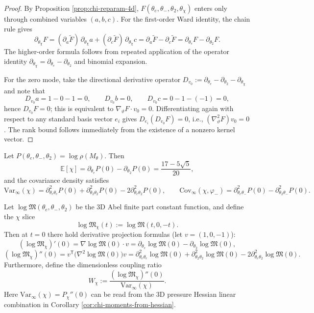 \begin{proof}
By Proposition \ref{prop:chi-reparam-4d}, \(F(\theta_e,\theta_-,\theta_2,\theta_\chi)\) enters only through combined variables \((a,b,c)\).
For the first-order Ward identity, the chain rule gives
$$
\partial_{\theta_\chi}F
=(\partial_a\widetilde F)\,\partial_{\theta_\chi}a+(\partial_c\widetilde F)\,\partial_{\theta_\chi}c
=\partial_a\widetilde F-\partial_c\widetilde F
=\partial_{\theta_e}F-\partial_{\theta_2}F.
$$
The higher-order formula follows from repeated application of the operator identity \(\partial_{\theta_\chi}=\partial_{\theta_e}-\partial_{\theta_2}\) and binomial expansion.
\par
For the zero mode, take the directional derivative operator
\(
D_{v_0}:=\partial_{\theta_e}-\partial_{\theta_2}-\partial_{\theta_\chi}
\)
and note that
$$
D_{v_0}a=1-0-1=0,\qquad
D_{v_0}b=0,\qquad
D_{v_0}c=0-1-(-1)=0,
$$
hence \(D_{v_0}F=0\); this is equivalent to \(\nabla_\vartheta F\cdot v_0=0\).
Differentiating again with respect to any standard basis vector \(e_i\) gives \(D_{e_i}(D_{v_0}F)=0\), i.e., \((\nabla_\vartheta^2F)v_0=0\).
The rank bound follows immediately from the existence of a nonzero kernel vector.
\end{proof}

\begin{corollary}\label{cor:chi-moments-from-hessian}
Let $P(\theta_e,\theta_-,\theta_2)=\log\rho(M_\theta)$. Then
\[
\mathbb{E}[\chi]=\partial_{\theta_e}P(0)-\partial_{\theta_2}P(0)=\frac{17-5\sqrt5}{20},
\]
and the covariance density satisfies
\[
\mathrm{Var}_\infty(\chi)=\partial_{\theta_e\theta_e}^2P(0)+\partial_{\theta_2\theta_2}^2P(0)-2\partial_{\theta_e\theta_2}^2P(0),
\qquad
\mathrm{Cov}_\infty(\chi,\varphi_-)=\partial_{\theta_e\theta_-}^2P(0)-\partial_{\theta_2\theta_-}^2P(0).
\]
\end{corollary}

\begin{corollary}\label{cor:chi-slice-logm-derivatives-and-W}
Let \(\log\mathfrak{M}(\theta_e,\theta_-,\theta_2)\) be the 3D Abel finite part constant function, and define the \(\chi\) slice
$$
\log\mathfrak{M}_\chi(t):=\log\mathfrak{M}(t,0,-t).
$$
Then at \(t=0\) there hold derivative projection formulas (let \(v=(1,0,-1)\)):
$$
(\log\mathfrak{M}_\chi)'(0)
=\nabla\log\mathfrak{M}(0)\cdot v
=\partial_{\theta_e}\log\mathfrak{M}(0)-\partial_{\theta_2}\log\mathfrak{M}(0),
$$
$$
(\log\mathfrak{M}_\chi)''(0)
=v^{\mathsf T}\bigl(\nabla^2\log\mathfrak{M}(0)\bigr)v
=\partial_{\theta_e\theta_e}^2\log\mathfrak{M}(0)+\partial_{\theta_2\theta_2}^2\log\mathfrak{M}(0)-2\partial_{\theta_e\theta_2}^2\log\mathfrak{M}(0).
$$
Furthermore, define the dimensionless coupling ratio
$$
W_\chi:=\frac{(\log\mathfrak{M}_\chi)''(0)}{\mathrm{Var}_\infty(\chi)}.
$$
Here \(\mathrm{Var}_\infty(\chi)=P_\chi''(0)\) can be read from the 3D pressure Hessian linear combination in Corollary \ref{cor:chi-moments-from-hessian}.
\end{corollary}


